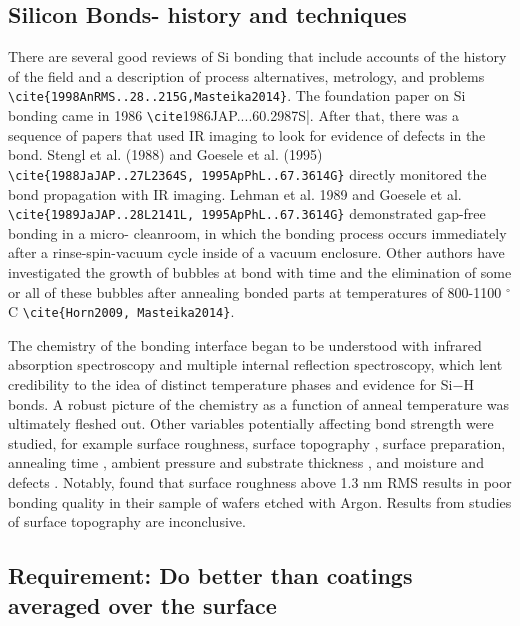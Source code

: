 \documentclass[osajnl,preprint,showpacs,superscriptaddress,12pt]{revtex4-1} %
\begin{document}
\subsection{Silicon Bonds- history and techniques}

There are several good reviews of Si bonding that include accounts of the history of the field and a description of process alternatives, metrology, and problems \verb|\cite{1998AnRMS..28..215G,Masteika2014}|.  The foundation paper on Si bonding came in 1986 \verb|\cite|{1986JAP....60.2987S}|. After that, there was a sequence of papers that used IR imaging to look for evidence of defects in the bond. Stengl et al. (1988) and Goesele et al. (1995) \verb|\cite{1988JaJAP..27L2364S, 1995ApPhL..67.3614G}| directly monitored the bond propagation with IR imaging. Lehman et al. 1989 and Goesele et al. \verb|\cite{1989JaJAP..28L2141L, 1995ApPhL..67.3614G}| demonstrated gap-free bonding in a micro- cleanroom, in which the bonding process occurs immediately after a rinse-spin-vacuum cycle inside of a vacuum enclosure.  Other authors have investigated the growth of bubbles at bond with time and the elimination of some or all of these bubbles after annealing bonded parts at temperatures of 800-1100 $^\circ$C \verb|\cite{Horn2009, Masteika2014}|.

The chemistry of the bonding interface began to be understood with infrared absorption spectroscopy and multiple internal reflection spectroscopy\cite{feijoo1994}, which lent credibility to the idea of distinct temperature phases and evidence for Si$-$H bonds\cite{1995ApPhA..61..101R}.  A robust picture of the chemistry as a function of anneal temperature was ultimately fleshed out\cite{1996JaJAP..35.2102R, 1998AnRMS..28..215G}.  Other variables potentially affecting bond strength were studied, for example surface roughness\cite{JJAP.37.4197}, surface topography \cite{2001JOptA...3...85G}, surface preparation\cite{1996ApPhL..68.2222T}, annealing time \cite{2000JAP....88.4404H}, ambient pressure and substrate thickness \cite{1995ApPhL..67..863G, 2007ApOpt..46.6793H}, and moisture and defects \cite{2001JAP....89.6013L}.  Notably, \cite{JJAP.37.4197} found that surface roughness above 1.3 nm RMS results in poor bonding quality in their sample of wafers etched with Argon.  Results from studies of surface topography are inconclusive\cite{2001JOptA...3...85G}.

\subsection{Requirement:  Do better than coatings averaged over the surface}
\end{document}
